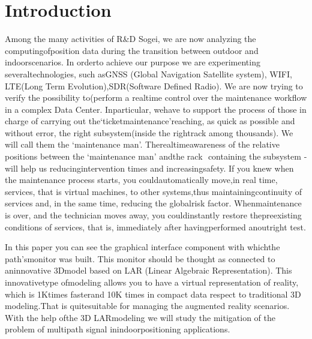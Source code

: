 \documentclass{sig-alternate}
\begin{document}


\section{Introduction}\label{introduction}


Among the many activities of R\&D Sogei, we are now analyzing the
computingofposition data during the transition between outdoor and
indoorscenarios. In orderto achieve our purpose we are experimenting
severaltechnologies, such asGNSS (Global Navigation Satellite system), WI­FI,
LTE(Long Term Evolution),SDR(Software Defined Radio). We are now trying to
verify the possibility to(perform a realtime control over the maintenance
workflow in a complex Data Center. Inparticular, wehave to support the process
of those in charge of carrying out the‘ticket­maintenance’reaching, as quick
as possible and without error, the right sub­system(inside the rightrack among
thousands). We will call them the ‘maintenance man’. Thereal­timeawareness of
the relative positions between the ‘maintenance man' andthe rack ­ containing
the sub­system ­ will help us reducingintervention times and increasingsafety.
If you knew when the maintenance process starts, you couldautomatically
move,in real time, services, that is virtual machines, to other systems,thus
maintainingcontinuity of services and, in the same time, reducing the
globalrisk factor. Whenmaintenance is over, and the technician moves away, you
couldinstantly restore thepre­existing conditions of services, that is,
immediately after havingperformed anoutright test.

In this paper you can see the graphical interface component with whichthe
path'smonitor was built. This monitor should be thought as connected to
aninnovative 3Dmodel based on LAR (Linear Algebraic Representation). This
innovativetype ofmodeling allows you to have a virtual representation of
reality, which is 1Ktimes fasterand 10K times in compact data respect to
traditional 3D modeling.That is quitesuitable for managing the augmented
reality scenarios. With the help ofthe 3D LARmodeling we will study the
mitigation of the problem of multi­path signal inindoorpositioning
applications.
\end{document}
